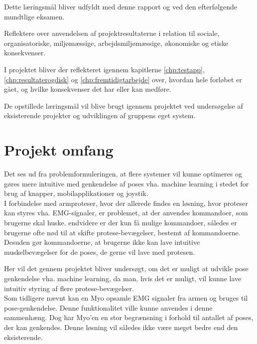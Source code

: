 \begin{myItemize}
	\begin{myItemize}
		\item Dette læringsmål bliver udfyldt med denne rapport og ved den efterfølgende mundtlige eksamen.
	\end{myItemize}
	\item Reflektere over anvendelsen af projektresultaterne i relation til sociale, organisatoriske, miljømæssige, arbejdsmiljømæssige, økonomiske og etiske konsekvenser.
	\begin{myItemize}
		\item I projektet bliver der reflekteret igennem kapitlerne \ref{chp:testapp}, \ref{chp:resultaterogdisk} og \ref{chp:fremtidigtarbejde} over, hvordan hele forløbet er gået, og hvilke konsekvenser det har eller kan medføre.
	\end{myItemize}
\end{myItemize}

De opstillede læringsmål vil blive brugt igennem projektet ved undersøgelse af eksisterende projekter og udviklingen af gruppens eget system.\\


\section{Projekt omfang}
Det ses ud fra problemformuleringen, at flere systemer vil kunne optimeres og gøres mere intuitive med genkendelse af poses vha. machine learning i stedet for brug af knapper, mobilapplikationer og joystik. \\

I forbindelse med armproteser, hvor der allerede findes en løsning, hvor proteser kan styres vha. EMG-signaler, er problemet, at der anvendes kommandoer, som brugerne skal huske. endvidere er der kun få mulige kommandoer, således er brugerne ofte nød til at skifte protese-bevægelser, bestemt af kommandoerne. Desuden gør kommandoerne, at brugerne ikke kan lave intuitive muskelbevægelser for de poses, de gerne vil lave med protesen. 

Her vil det gennem projektet bliver undersøgt, om det er muligt at udvikle pose genkendelse vha. machine learning, da man, hvis det er muligt, vil kunne lave intuitiv styring af flere protese-bevægelser. \\
Som tidligere nævnt kan en Myo opsamle EMG signaler fra armen og bruges til pose-genkendelse. Denne funktionalitet ville kunne anvendes i denne sammenhæng. Dog har Myo'en en stor begrænsning i forhold til antallet af poses, der kan genkendes. Denne løsning vil således ikke være meget bedre end den eksisterende.\\

